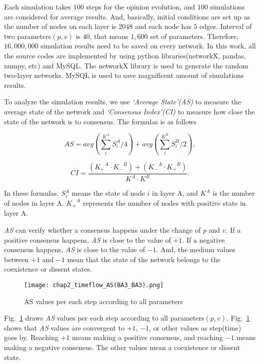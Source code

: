Each simulation takes $100$ steps for the opinion evolution, and $100$ simulations are considered for average results. And, basically, initial conditions are set up as the number of nodes on each layer is $2048$ and each node has $5$ edges. Interval of two parameters$(p, v)$ is $40$, that means $1,600$ set of parameters. Therefore, $16,000,000$ simulation results need to be saved on every network. In this work, all the source codes are implemented by using python libraries(networkX, pandas, numpy, etc) and MySQL. The networkX library is used to generate the random two-layer networks. MySQL is used to save magnificent amount of simulations results. 

To analyze the simulation results, we use \textit{`Average State'(AS)} to measure the average state of the network and \textit{`Consensus Index'(CI)} to measure how close the state of the network is to consensus. The formulas is as follows

\begin{equation}
AS = avg\left( {\sum\limits_i^{{K^A}} {S_i^A/4} } \right) + avg\left( {\sum\limits_i^{{K^B}} {S_i^B/2} } \right),
\end{equation}

\begin{equation}
CI = \frac{{({K_ + }^A \cdot {K_ - }^B) + ({K_ - }^A \cdot {K_ + }^B)}}{{{K^A} \cdot {K^B}}}.
\end{equation}

In these formulas, $S_i^A$ means the state of node $i$ in layer A, and $K^A$ is the number of nodes in layer A. ${K_ + }^A$ represents the number of nodes with positive state in layer A.   

\textit{AS} can verify whether a consensus happens under the change of $p$ and $v$.  If a positive consensus happens, \textit{AS} is close to the value of $+1$. If a negative consensus happens, \textit{AS} is close to the value of $-1$. And, the medium values between $+1$ and $-1$ mean that the state of the network belongs to the coexistence or dissent states.  

\begin{figure}[!htb]
	\centering
	\texttt{[image: chap2\_timeflow\_AS(BA3\_BA3).png]}
	\caption{AS values per each step according to all parameters}
	\label{chap2_timeflow_AS(BA3_BA3)}
\end{figure}

Fig.~\ref{chap2_timeflow_AS(BA3_BA3)} draws \textit{AS} values per each step according to all parameters$(p, v)$. Fig.~\ref{chap2_timeflow_AS(BA3_BA3)} shows that \textit{AS} values are convergent to $+1$, $-1$, or other values as step(time) goes by. Reaching $+1$ means making a positive consensus, and reaching $-1$ means making a negative consensus. The other values mean a coexistence or dissent state. 

